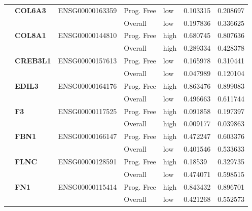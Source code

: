 \begin{spacing}{1}
{\begin{longtable}{|>{\bfseries}p{2cm}|>{\bfseries}p{1.9cm}|p{2.8cm}|p{2cm}|p{2cm}|p{1.5cm}|p{1.5cm}|}
             & COL6A3   & ENSG00000163359 & Prog. Free & low  & 0.103315 & 0.208697                \\
            \hhline{~~~----}
             &          &                 & Overall    & low  & 0.197836 & 0.336625                \\
            \hhline{~======}
             & COL8A1   & ENSG00000144810 & Prog. Free & high & 0.680745 & 0.807636                \\
            \hhline{~~~----}
             &          &                 & Overall    & high & 0.289334 & 0.428378                \\
            \hhline{~======}
             & CREB3L1  & ENSG00000157613 & Prog. Free & low  & 0.165978 & 0.310441                \\
            \hhline{~~~----}
             &          &                 & Overall    & low  & 0.047989 & 0.120104                \\
            \hhline{~======}
             & EDIL3    & ENSG00000164176 & Prog. Free & high & 0.863476 & 0.899083                \\
            \hhline{~~~----}
             &          &                 & Overall    & low  & 0.496663 & 0.611744                \\
            \hhline{~======}
             & F3       & ENSG00000117525 & Prog. Free & high & 0.091858 & 0.197397                \\
            \hhline{~~~----}
             &          &                 & Overall    & high & 0.009177 & 0.039863                \\
            \hhline{~======}
             & FBN1     & ENSG00000166147 & Prog. Free & high & 0.472247 & 0.603376                \\
            \hhline{~~~----}
             &          &                 & Overall    & low  & 0.401546 & 0.533633                \\
            \hhline{~======}
             & FLNC     & ENSG00000128591 & Prog. Free & high & 0.18539  & 0.329735                \\
            \hhline{~~~----}
             &          &                 & Overall    & low  & 0.474071 & 0.598515                \\
            \hhline{~======}
             & FN1      & ENSG00000115414 & Prog. Free & high & 0.843432 & 0.896701                \\
            \hhline{~~~----}
             &          &                 & Overall    & low  & 0.421268 & 0.552573                \\

\end{longtable}}
\end{spacing}
